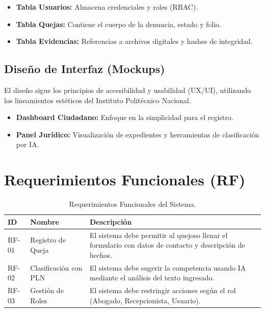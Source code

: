 \begin{itemize}
    \item \textbf{Tabla Usuarios:} Almacena credenciales y roles (RBAC).
    \item \textbf{Tabla Quejas:} Contiene el cuerpo de la denuncia, estado y folio.
    \item \textbf{Tabla Evidencias:} Referencias a archivos digitales y hashes de integridad.
\end{itemize}



\subsection{Diseño de Interfaz (Mockups)}
El diseño sigue los principios de accesibilidad y usabilidad (UX/UI), utilizando los lineamientos estéticos del Instituto Politécnico Nacional.

\begin{itemize}
    \item \textbf{Dashboard Ciudadano:} Enfoque en la simplicidad para el registro.
    \item \textbf{Panel Jurídico:} Visualización de expedientes y herramientas de clasificación por IA.
\end{itemize}

\section{Requerimientos Funcionales (RF)}
\begin{table}[htbp]
    \centering
    \begin{tabular}{|l|l|p{8cm}|}
    \hline
    \textbf{ID} & \textbf{Nombre} & \textbf{Descripción} \\ \hline
    RF-01 & Registro de Queja & El sistema debe permitir al quejoso llenar el formulario con datos de contacto y descripción de hechos. \\ \hline
    RF-02 & Clasificación con PLN & El sistema debe sugerir la competencia usando IA mediante el análisis del texto ingresado. \\ \hline
    RF-03 & Gestión de Roles & El sistema debe restringir acciones según el rol (Abogado, Recepcionista, Usuario). \\ \hline
    \end{tabular}
    \caption{Requerimientos Funcionales del Sistema.}
\end{table}

